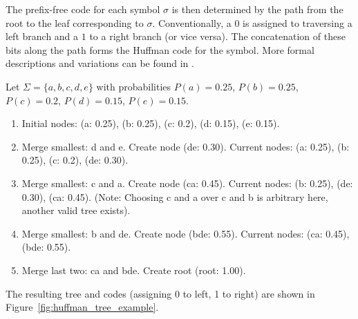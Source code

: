 The prefix-free code for each symbol $\sigma$ is then determined by the path from the root to the leaf corresponding to $\sigma$. Conventionally, a $0$ is assigned to traversing a left branch and a $1$ to a right branch (or vice versa). The concatenation of these bits along the path forms the Huffman code for the symbol. More formal descriptions and variations can be found in \cite{ferragina2023pearls, sayood2002lossless, han2002mathematics, ElementsofInformationTheory}.

\begin{example} \label{ex:huffman_construction}
    Let $\Sigma = \{a, b, c, d, e\}$ with probabilities $P(a)= 0.25$, $P(b)=0.25$, $P(c)=0.2$, $P(d)=0.15$, $P(e)=0.15$.
    \begin{enumerate}
        \item Initial nodes: (a: 0.25), (b: 0.25), (c: 0.2), (d: 0.15), (e: 0.15).
        \item Merge smallest: d and e. Create node (de: 0.30). Current nodes: (a: 0.25), (b: 0.25), (c: 0.2), (de: 0.30).
        \item Merge smallest: c and a. Create node (ca: 0.45). Current nodes: (b: 0.25), (de: 0.30), (ca: 0.45). (Note: Choosing c and a over c and b is arbitrary here, another valid tree exists).
        \item Merge smallest: b and de. Create node (bde: 0.55). Current nodes: (ca: 0.45), (bde: 0.55).
        \item Merge last two: ca and bde. Create root (root: 1.00).
    \end{enumerate}
    The resulting tree and codes (assigning 0 to left, 1 to right) are shown in Figure~\ref{fig:huffman_tree_example}.


\end{example}
